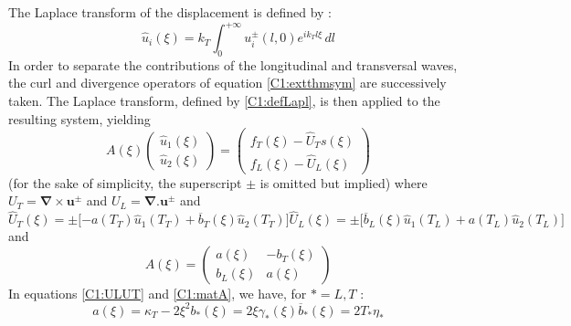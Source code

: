 The Laplace transform of the displacement is defined by :
\begin{equation}
\hat{u}_i(\xi)=k_T\int_0^{+\infty}u_i^\pm(l,0)e^{ik_Tl\xi}\, dl
\label{C1:defLapl}
\end{equation}
In order to separate the contributions of the longitudinal and transversal waves, the curl and divergence operators of equation \eqref{C1:extthmsym} are successively taken. The Laplace transform, defined by \eqref{C1:defLapl}, is then applied to the resulting system, yielding
\begin{equation}
A(\xi)\begin{pmatrix}
\hat{u}_1(\xi)\\
\hat{u}_2(\xi)
\end{pmatrix}
= \begin{pmatrix}
f_T(\xi)-\hat{U}_Ts(\xi)\\
f_L(\xi)-\hat{U}_L(\xi)
\end{pmatrix}
\end{equation}
(for the sake of simplicity, the superscript $\pm$ is omitted but implied) where $U_T=\mathbf{\nabla}\times\mathbf{u}^\pm$ and $U_L=\mathbf{\nabla}.\mathbf{u}^\pm$ and 
\begin{subequations}
\begin{equation}
\hat{U}_T(\xi)=\pm\lbrack -a(T_T)\hat{u}_1(T_T)+\overline{b}_T(\xi)\hat{u}_2(T_T) \rbrack
\end{equation}
\begin{equation}
\hat{U}_L(\xi)=\pm\lbrack \overline{b}_L(\xi)\hat{u}_1(T_L)+a(T_L)\hat{u}_2(T_L) \rbrack
\end{equation}
\label{C1:ULUT}
\end{subequations}
and
\begin{equation}
A(\xi)=\begin{pmatrix}
a(\xi)&-b_T(\xi)\\
b_L(\xi)&a(\xi)
\end{pmatrix}
\label{C1:matA}
\end{equation}
In equations \eqref{C1:ULUT} and \eqref{C1:matA}, we have, for $*=L,T$ :
\begin{subequations}
\begin{equation}
a(\xi)=\kappa_T-2\xi^2
\end{equation}
\begin{equation}
b_*(\xi)=2\xi\gamma_*(\xi)
\end{equation}
\begin{equation}
\overline{b}_*(\xi)=2T_*\eta_*
\end{equation}
\end{subequations}
